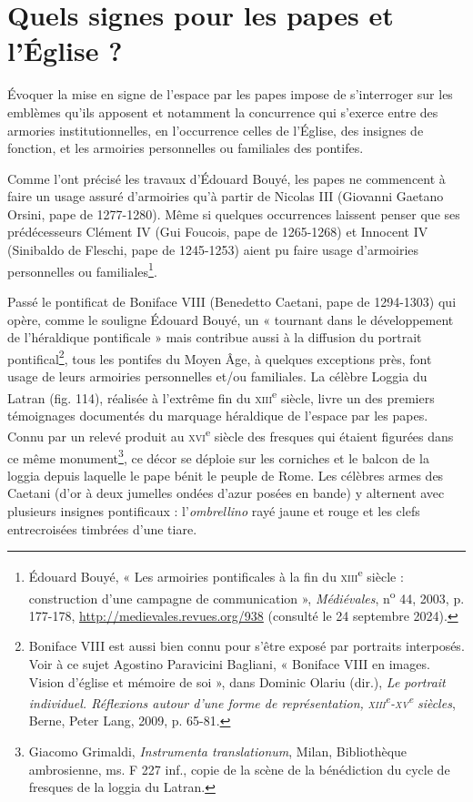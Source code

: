 \documentclass[12pt,twoside,openany]{book}
\begin{document}
\section{Quels signes pour les papes et l’Église ?}

Évoquer la mise en signe de l’espace par les papes impose de s’interroger sur les emblèmes qu’ils apposent et notamment la concurrence qui s’exerce entre des armories institutionnelles, en l’occurrence celles de l’Église, des insignes de fonction, et les armoiries personnelles ou familiales des pontifes.

Comme l’ont précisé les travaux d’Édouard Bouyé, les papes ne commencent à faire un usage assuré d’armoiries qu’à partir de Nicolas III (Giovanni Gaetano Orsini, pape de 1277-1280). Même si quelques occurrences laissent penser que ses prédécesseurs Clément IV (Gui Foucois, pape de 1265-1268) et Innocent IV (Sinibaldo de Fleschi, pape de 1245-1253) aient pu faire usage d’armoiries personnelles ou familiales\footnote{Édouard Bouyé, « Les armoiries pontificales à la fin du \textsc{xiii}\textsuperscript{e} siècle : construction d’une campagne de communication », \textit{Médiévales}, n\textsuperscript{o} 44, 2003, p. 177-178, \href{http://medievales.revues.org/938}{http://medievales.revues.org/938} (consulté le 24 septembre 2024).}.

Passé le pontificat de Boniface VIII (Benedetto Caetani, pape de 1294-1303) qui opère, comme le souligne Édouard Bouyé, un « tournant dans le développement de l’héraldique pontificale » mais contribue aussi à la diffusion du portrait pontifical\footnote{Boniface VIII est aussi bien connu pour s’être exposé par portraits interposés. Voir à ce sujet Agostino Paravicini Bagliani, « Boniface VIII en images. Vision d'église et mémoire de soi », dans Dominic Olariu (dir.), \textit{Le portrait individuel. Réflexions autour d’une forme de représentation, }\textit{\textsc{xiii}}\textit{\textsuperscript{e}}\textit{-}\textit{\textsc{xv}}\textit{\textsuperscript{e}}\textit{ siècles}, Berne, Peter Lang, 2009, p. 65-81.}, tous les pontifes du Moyen Âge, à quelques exceptions près, font usage de leurs armoiries personnelles et/ou familiales. La célèbre Loggia du Latran (fig. 114), réalisée à l’extrême fin du \textsc{xiii}\textsuperscript{e} siècle, livre un des premiers témoignages documentés du marquage héraldique de l’espace par les papes. Connu par un relevé produit au \textsc{xvi}\textsuperscript{e }siècle des fresques qui étaient figurées dans ce même monument\footnote{Giacomo Grimaldi, \textit{Instrumenta translationum}, Milan, Bibliothèque ambrosienne, ms. F 227 inf., copie de la scène de la bénédiction du cycle de fresques de la loggia du Latran.}, ce décor se déploie sur les corniches et le balcon de la loggia depuis laquelle le pape bénit le peuple de Rome. Les célèbres armes des Caetani (d’or à deux jumelles ondées d’azur posées en bande) y alternent avec plusieurs insignes pontificaux : l’\textit{ombrellino} rayé jaune et rouge et les clefs entrecroisées timbrées d’une tiare.
\end{document}
